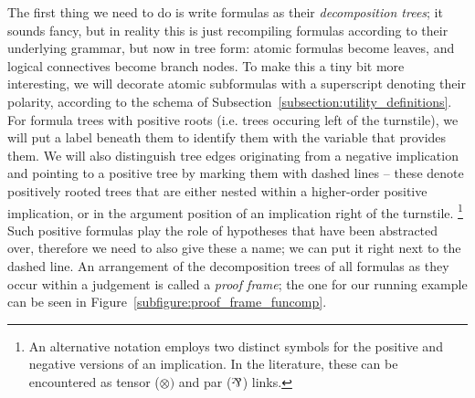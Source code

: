 The first thing we need to do is write formulas as their \textit{decomposition trees}; it sounds fancy, but in reality this is just recompiling formulas according to their underlying grammar, but now in tree form:
atomic formulas become leaves, and logical connectives become branch nodes.
To make this a tiny bit more interesting, we will decorate atomic subformulas with a superscript denoting their polarity, according to the schema of Subsection~\ref{subsection:utility_definitions}.
For formula trees with positive roots (i.e. trees occuring left of the turnstile), we will put a label beneath them to identify them with the variable that provides them.
We will also distinguish tree edges originating from a negative implication and pointing to a positive tree by marking them with dashed lines -- these denote positively rooted trees that are either nested within a higher-order positive implication, or in the argument position of an implication right of the turnstile.%
\footnote{An alternative notation employs two distinct symbols for the positive and negative versions of an implication. In the literature, these can be encountered as tensor ($\otimes)$ and par ($\parlink$) links.}
Such positive formulas play the role of hypotheses that have been abstracted over, therefore we need to also give these a name; we can put it right next to the dashed line.
An arrangement of the decomposition trees of all formulas as they occur within a judgement is called a \textit{proof frame}; the one for our running example can be seen in Figure~\ref{subfigure:proof_frame_funcomp}.

